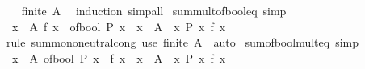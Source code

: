 \begin{isabellebody}
%
\isadelimproof
\ \ %
\endisadelimproof
%
\isatagproof
{}\isamarkupfalse%
\ {\isacartoucheopen}finite\ A{\isacartoucheclose}\ \isamarkupfalse%
\ induction\ simp{\isacharunderscore}{\kern0pt}all%
\endisatagproof
{\isafoldproof}%
%
\isadelimproof
\isanewline
%
\endisadelimproof
\isanewline
{}\isamarkupfalse%
\ sum{\isacharunderscore}{\kern0pt}mult{\isacharunderscore}{\kern0pt}of{\isacharunderscore}{\kern0pt}bool{\isacharunderscore}{\kern0pt}eq\ {\isacharbrackleft}{\kern0pt}simp{\isacharbrackright}{\kern0pt}{\isacharcolon}{\kern0pt}\isanewline
\ \ {\isacartoucheopen}{\isacharparenleft}{\kern0pt}{\isasymSum}x\ {\isasymin}\ A{\isachardot}{\kern0pt}\ f\ x\ {\isacharasterisk}{\kern0pt}\ of{\isacharunderscore}{\kern0pt}bool\ {\isacharparenleft}{\kern0pt}P\ x{\isacharparenright}{\kern0pt}{\isacharparenright}{\kern0pt}\ {\isacharequal}{\kern0pt}\ {\isacharparenleft}{\kern0pt}{\isasymSum}x\ {\isasymin}\ {\isacharparenleft}{\kern0pt}A\ {\isasyminter}\ {\isacharbraceleft}{\kern0pt}x{\isachardot}{\kern0pt}\ P\ x{\isacharbraceright}{\kern0pt}{\isacharparenright}{\kern0pt}{\isachardot}{\kern0pt}\ f\ x{\isacharparenright}{\kern0pt}{\isacartoucheclose}\isanewline
%
\isadelimproof
\ \ %
\endisadelimproof
%
\isatagproof
{}\isamarkupfalse%
\ {\isacharparenleft}{\kern0pt}rule\ sum{\isachardot}{\kern0pt}mono{\isacharunderscore}{\kern0pt}neutral{\isacharunderscore}{\kern0pt}cong{\isacharparenright}{\kern0pt}\ {\isacharparenleft}{\kern0pt}use\ {\isacartoucheopen}finite\ A{\isacartoucheclose}\ \ auto{\isacharparenright}{\kern0pt}%
\endisatagproof
{\isafoldproof}%
%
\isadelimproof
\isanewline
%
\endisadelimproof
\isanewline
{}\isamarkupfalse%
\ sum{\isacharunderscore}{\kern0pt}of{\isacharunderscore}{\kern0pt}bool{\isacharunderscore}{\kern0pt}mult{\isacharunderscore}{\kern0pt}eq\ {\isacharbrackleft}{\kern0pt}simp{\isacharbrackright}{\kern0pt}{\isacharcolon}{\kern0pt}\isanewline
\ \ {\isacartoucheopen}{\isacharparenleft}{\kern0pt}{\isasymSum}x\ {\isasymin}\ A{\isachardot}{\kern0pt}\ of{\isacharunderscore}{\kern0pt}bool\ {\isacharparenleft}{\kern0pt}P\ x{\isacharparenright}{\kern0pt}\ {\isacharasterisk}{\kern0pt}\ f\ x{\isacharparenright}{\kern0pt}\ {\isacharequal}{\kern0pt}\ {\isacharparenleft}{\kern0pt}{\isasymSum}x\ {\isasymin}\ {\isacharparenleft}{\kern0pt}A\ {\isasyminter}\ {\isacharbraceleft}{\kern0pt}x{\isachardot}{\kern0pt}\ P\ x{\isacharbraceright}{\kern0pt}{\isacharparenright}{\kern0pt}{\isachardot}{\kern0pt}\ f\ x{\isacharparenright}{\kern0pt}{\isacartoucheclose}\isanewline
%
\isadelimproof

\end{isabellebody}
